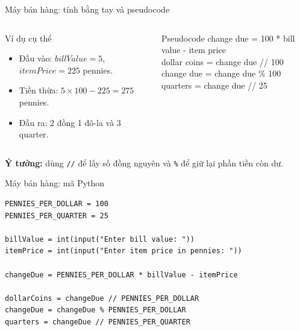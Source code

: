 \documentclass[aspectratio=169,10pt]{beamer}
\begin{document}
\begin{frame}{Máy bán hàng: tính bằng tay và pseudocode}
\small
\begin{columns}[T,totalwidth=0.92\textwidth]
\begin{block}{Ví dụ cụ thể}
\begin{itemize}
  \item Đầu vào: $billValue=5$, $itemPrice=225$ pennies.
  \item Tiền thừa: $5\times100-225=275$ pennies.
  \item Đầu ra: $2$ đồng 1 đô-la và $3$ quarter.
\end{itemize}
\end{block}
\hfill
{}
\begin{block}{Pseudocode}
\ttfamily\scriptsize
change due = 100 * bill value - item price\\[0.12cm]
dollar coins = change due // 100\\[0.12cm]
change due = change due \% 100\\[0.12cm]
quarters = change due // 25
\end{block}
\end{columns}
\vspace{0.28cm}
\begin{center}
\small \textbf{Ý tưởng:} dùng \texttt{//} để lấy số đồng nguyên và \texttt{\%} để giữ lại phần tiền còn dư.
\end{center}
\end{frame}

\begin{frame}[fragile]{Máy bán hàng: mã Python}
\begin{lstlisting}
PENNIES_PER_DOLLAR = 100
PENNIES_PER_QUARTER = 25

billValue = int(input("Enter bill value: "))
itemPrice = int(input("Enter item price in pennies: "))

changeDue = PENNIES_PER_DOLLAR * billValue - itemPrice

dollarCoins = changeDue // PENNIES_PER_DOLLAR
changeDue = changeDue % PENNIES_PER_DOLLAR
quarters = changeDue // PENNIES_PER_QUARTER
\end{lstlisting}
\end{frame}

\end{document}

